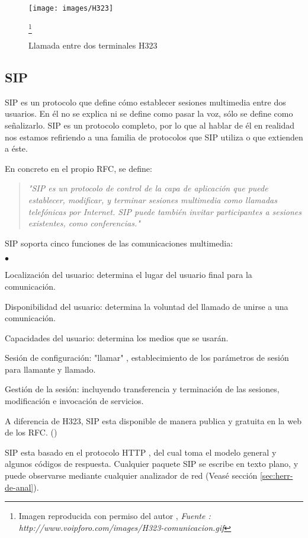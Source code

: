 \begin{figure}
  \centering
  \texttt{[image: images/H323]}
  \caption{Llamada entre dos terminales H323}
  \label{fig:llamada-H323}
  \footnote{Imagen reproducida con permiso del autor , \emph{Fuente : http://www.voipforo.com/images/H323-comunicacion.gif}}
\end{figure}

\subsection{SIP}


SIP es un protocolo que define cómo establecer sesiones multimedia entre dos usuarios. En él no se explica ni se define como pasar la voz, sólo se define como señalizarlo. SIP es un protocolo completo, por lo que al hablar de él en realidad nos estamos refiriendo a una familia de protocolos que SIP utiliza o que extienden a éste.

En concreto en el propio RFC\cite{rfc3261}, se define: 
\begin{quotation}
  

\emph{"SIP es un protocolo de control de la capa de aplicación que puede establecer, modificar, y terminar sesiones multimedia como llamadas telefónicas por Internet. SIP puede también invitar participantes a sesiones existentes, como conferencias."
}
\end{quotation}

SIP soporta cinco funciones de las comunicaciones multimedia:
\begin{list}{$\bullet$}{}
\item Localización del usuario: determina el lugar del usuario final para la comunicación.
\item Disponibilidad del usuario: determina la voluntad del llamado de unirse a una comunicación.
\item Capacidades del usuario: determina los medios que se usarán.
\item Sesión de configuración: "llamar" , establecimiento de los parámetros de sesión para llamante y llamado.
\item Gestión de la sesión: incluyendo transferencia y terminación de las sesiones, modificación e invocación de servicios.
\end{list}


A diferencia de H323, SIP  esta disponible de manera publica y gratuita en la web de los RFC. (\cite{rfc3261})

SIP esta basado en el protocolo HTTP \cite{rfc2616}, del cual toma el modelo general y algunos códigos de respuesta. Cualquier paquete SIP se escribe en texto plano, y puede observarse mediante cualquier analizador de red (Veasé sección \vref{sec:herr-de-anal}).

